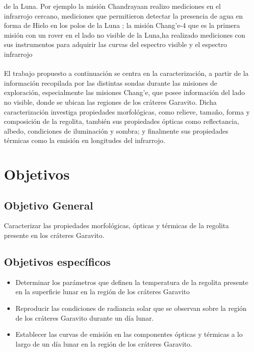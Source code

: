\documentclass[12pt]{article}
\begin{document}
de la Luna. Por ejemplo la misión Chandrayaan realizo mediciones en el infrarrojo cercano, mediciones que 
permitieron detectar la presencia de agua en forma de Hielo en los polos de la Luna 
\parencite{VERMA2022115075}; 
la misión Chang'e-4 que es la primera misión con un rover en el lado no visible de la Luna,ha realizado 
mediciones con sus instrumentos para adquirir las curvas del espectro visible y el espectro infrarrojo 
\parencite{JIA2018207} \\
\\
El trabajo propuesto a continuación se centra en la caracterización, a partir de la información 
recopilada por las distintas sondas durante las misiones de exploración, especialmente las misiones Chang'e, 
que posee información del lado no visible, donde se ubican las regiones de 
los cráteres Garavito. Dicha caracterización investiga propiedades morfológicas, como relieve, tamaño, forma 
y composición de la regolita, también sus propiedades ópticas como reflectancia, albedo, 
condiciones de iluminación y sombra; y finalmente sus propiedades térmicas como la emisión 
en longitudes del infrarrojo\parencite{DSOUZA20242297}.

\newpage
\section{Objetivos}\label{sec:objetivos}
\subsection{Objetivo General}
Caracterizar las propiedades morfológicas, ópticas y térmicas de la regolita 
presente en los cráteres Garavito.
\subsection{Objetivos específicos}
\begin{itemize}
    \item Determinar los parámetros que definen la temperatura de la regolita 
    presente en la superficie lunar en la región de los cráteres Garavito\\    
    \item Reproducir las condiciones de radiancia solar que se observan sobre la 
    región de los cráteres Garavito durante un día lunar.\\    
    \item Establecer las curvas de emisión en las componentes ópticas y térmicas a 
    lo largo de un día lunar en la región de los cráteres Garavito.\\    
\end{itemize}
\end{document}
